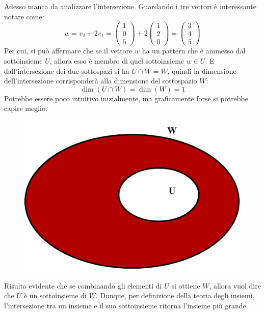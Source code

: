\documentclass[a4paper]{article}
\begin{document}
	\noindent
	Adesso manca da analizzare l'intersezione. Guardando i tre vettori è interessante notare come:
	\begin{equation*}
		w = v_{2} + 2v_{1} = \begin{pmatrix}
			1 \\
			0 \\
			5
		\end{pmatrix} + 2\begin{pmatrix}
			1 \\
			2 \\
			0
		\end{pmatrix} = \begin{pmatrix}
			3 \\
			4 \\
			5
		\end{pmatrix}
	\end{equation*}
	Per cui, si può affermare che se il vettore $w$ ha un pattern che è ammesso dal sottoinsieme $U$, allora esso è membro di quel sottoinsieme $w \in U$. E dall'intersezione dei due sottospazi si ha $U \cap W = W$, quindi la dimensione dell'intersezione corrisponderà alla dimensione del sottospazio $W$:
	\begin{equation*}
		\dim\left(U \cap W\right) = \dim\left(W\right) = 1
	\end{equation*}
	Potrebbe essere poco intuitivo inizialmente, ma graficamente forse si potrebbe capire meglio:
	\begin{figure}[!htp]
		\centering
		\includegraphics[width=.7\textwidth]{img/exams/2022-02-09/insiemi.pdf}
	\end{figure}
	
	\noindent
	Risulta evidente che se combinando gli elementi di $U$ si ottiene $W$, allora vuol dire che $U$ è un sottoinsieme di $W$. Dunque, per definizione della teoria degli insiemi, l'intersezione tra un insieme e il suo sottoinsieme ritorna l'insieme più grande.\newline
	
\end{document}
